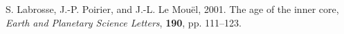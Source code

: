 \begin{thebibliography}{}

%
S. Labrosse, J.-P. Poirier, and J.-L. Le Mou{\"e}l, 2001. The age of the inner core, {\it Earth and Planetary Science Letters}, {\bf 190}, pp. 111--123.
%
\end{thebibliography}
